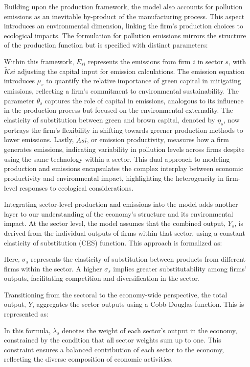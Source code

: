 Building upon the production framework, the model also accounts for pollution emissions as an inevitable by-product of the manufacturing process. This aspect introduces an environmental dimension, linking the firm's production choices to ecological impacts. The formulation for pollution emissions mirrors the structure of the production function but is specified with distinct parameters:

Within this framework, $E_{si}$ represents the emissions from firm $i$ in sector $s$, with $\tilde{K}{si}$ adjusting the capital input for emission calculations. The emission equation introduces $\mu_s$ to quantify the relative importance of green capital in mitigating emissions, reflecting a firm's commitment to environmental sustainability. The parameter $\theta_s$ captures the role of capital in emissions, analogous to its influence in the production process but focused on the environmental externality. The elasticity of substitution between green and brown capital, denoted by $\eta_s$, now portrays the firm's flexibility in shifting towards greener production methods to lower emissions. Lastly, $\tilde{A}{si}$, or emission productivity, measures how  a firm generates emissions, indicating variability in pollution levels across firms despite using the same technology within a sector. This dual approach to modeling production and emissions encapsulates the complex interplay between economic productivity and environmental impact, highlighting the heterogeneity in firm-level responses to ecological considerations.

Integrating sector-level production and emissions into the model adds another layer to our understanding of the economy's structure and its environmental impact. At the sector level, the model assumes that the combined output, $Y_s$, is derived from the individual outputs of firms within that sector, using a constant elasticity of substitution (CES) function. This approach is formalized as:

Here, $\sigma_s$ represents the elasticity of substitution between products from different firms within the sector. A higher $\sigma_s$ implies greater substitutability among firms' outputs, facilitating competition and diversification in the sector.

Transitioning from the sectoral to the economy-wide perspective, the total output, $Y$, aggregates the sector outputs using a Cobb-Douglas function. This is represented as:

In this formula, $\lambda_s$ denotes the weight of each sector's output in the economy, constrained by the condition that all sector weights sum up to one. This constraint ensures a balanced contribution of each sector to the economy, reflecting the diverse composition of economic activities.

